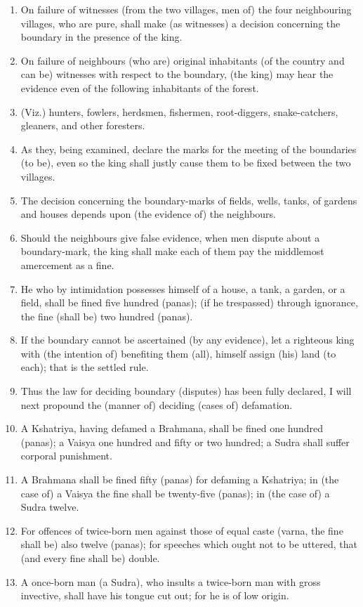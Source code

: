 \begin{enumerate}
\item On failure of witnesses (from the two villages, men of) the four neighbouring villages, who are pure, shall make (as witnesses) a decision concerning the boundary in the presence of the king.
\item On failure of neighbours (who are) original inhabitants (of the country and can be) witnesses with respect to the boundary, (the king) may hear the evidence even of the following inhabitants of the forest.
\item (Viz.) hunters, fowlers, herdsmen, fishermen, root-diggers, snake-catchers, gleaners, and other foresters.
\item As they, being examined, declare the marks for the meeting of the boundaries (to be), even so the king shall justly cause them to be fixed between the two villages.
\item The decision concerning the boundary-marks of fields, wells, tanks, of gardens and houses depends upon (the evidence of) the neighbours.
\item Should the neighbours give false evidence, when men dispute about a boundary-mark, the king shall make each of them pay the middlemost amercement as a fine.
\item He who by intimidation possesses himself of a house, a tank, a garden, or a field, shall be fined five hundred (panas); (if he trespassed) through ignorance, the fine (shall be) two hundred (panas).
\item If the boundary cannot be ascertained (by any evidence), let a righteous king with (the intention of) benefiting them (all), himself assign (his) land (to each); that is the settled rule.
\item Thus the law for deciding boundary (disputes) has been fully declared, I will next propound the (manner of) deciding (cases of) defamation.
\item A Kshatriya, having defamed a Brahmana, shall be fined one hundred (panas); a Vaisya one hundred and fifty or two hundred; a Sudra shall suffer corporal punishment.
\item A Brahmana shall be fined fifty (panas) for defaming a Kshatriya; in (the case of) a Vaisya the fine shall be twenty-five (panas); in (the case of) a Sudra twelve.
\item For offences of twice-born men against those of equal caste (varna, the fine shall be) also twelve (panas); for speeches which ought not to be uttered, that (and every fine shall be) double.
\item A once-born man (a Sudra), who insults a twice-born man with gross invective, shall have his tongue cut out; for he is of low origin.

\end{enumerate}
